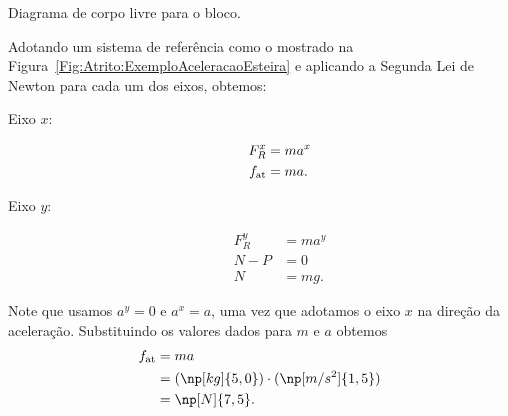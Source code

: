 \begin{marginfigure}
\centering
{}
\caption{Diagrama de corpo livre para o bloco.\label{Fig:Atrito:ExemploAceleracaoEsteira2}}
\end{marginfigure}

Adotando um sistema de referência como o mostrado na Figura~\ref{Fig:Atrito:ExemploAceleracaoEsteira} e aplicando a Segunda Lei de Newton para cada um dos eixos, obtemos:
\begin{description}
    \item[Eixo $x$:]
        \begin{align}
            F_R^x &= m a^x \\
            f_{\rm{at}} &= m a.
        \end{align}
    \item[Eixo $y$:]
        \begin{align}
            F_R^y &= m a^y \\
            N - P &= 0 \\
            N &= mg.
        \end{align}
\end{description}
%
Note que usamos $a^y = 0$ e $a^x = a$, uma vez que adotamos o eixo $x$ na direção da aceleração. Substituindo os valores dados para $m$ e $a$ obtemos
\begin{align}
    f_{\rm{at}} &= m a \\
    &= (\np[kg]{5,0}) \cdot (\np[m/s^2]{1,5}) \\
    &= \np[N]{7,5}.
\end{align}

